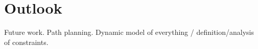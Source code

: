 \chapter{Outlook}\label{outlook}

Future work.
Path planning. Dynamic model of everything / definition/analysis of constraints. 